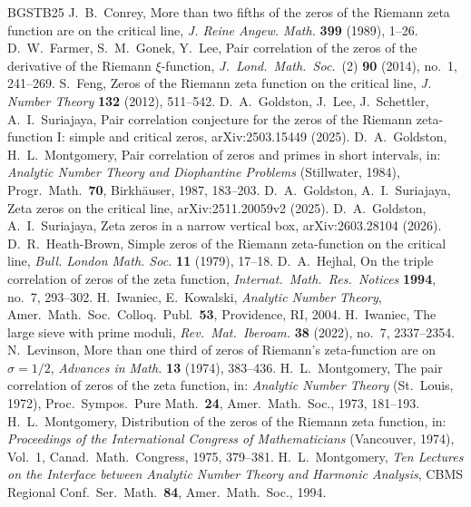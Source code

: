 \documentclass[11pt]{amsart}
\theoremstyle{definition}
\theoremstyle{remark}
\numberwithin{equation}{section}
\begin{document}
\begin{thebibliography}{BGSTB25}
 J.~B.~Conrey, More than two fifths of the zeros of the Riemann zeta function are on the critical line, \emph{J. Reine Angew. Math.} \textbf{399} (1989), 1--26.
 D.~W.~Farmer, S.~M.~Gonek, Y.~Lee, Pair correlation of the zeros of the derivative of the Riemann $\xi$-function, \emph{J.\ Lond.\ Math.\ Soc.}\ (2) \textbf{90} (2014), no.~1, 241--269.
 S.~Feng, Zeros of the Riemann zeta function on the critical line, \emph{J. Number Theory} \textbf{132} (2012), 511--542.
 D.~A.~Goldston, J.~Lee, J.~Schettler, A.~I.~Suriajaya, Pair correlation conjecture for the zeros of the Riemann zeta-function I: simple and critical zeros, arXiv:2503.15449 (2025).
 D.~A.~Goldston, H.~L.~Montgomery, Pair correlation of zeros and primes in short intervals, in: \emph{Analytic Number Theory and Diophantine Problems} (Stillwater, 1984), Progr.\ Math.\ \textbf{70}, Birkh\"auser, 1987, 183--203.
 D.~A.~Goldston, A.~I.~Suriajaya, Zeta zeros on the critical line, arXiv:2511.20059v2 (2025).
 D.~A.~Goldston, A.~I.~Suriajaya, Zeta zeros in a narrow vertical box, arXiv:2603.28104 (2026).
 D.~R.~Heath-Brown, Simple zeros of the Riemann zeta-function on the critical line, \emph{Bull. London Math. Soc.} \textbf{11} (1979), 17--18.
 D.~A.~Hejhal, On the triple correlation of zeros of the zeta function, \emph{Internat.\ Math.\ Res.\ Notices} \textbf{1994}, no.~7, 293--302.
 H.~Iwaniec, E.~Kowalski, \emph{Analytic Number Theory}, Amer.\ Math.\ Soc.\ Colloq.\ Publ.\ \textbf{53}, Providence, RI, 2004.
 H.~Iwaniec, The large sieve with prime moduli, \emph{Rev.\ Mat.\ Iberoam.} \textbf{38} (2022), no.~7, 2337--2354.
 N.~Levinson, More than one third of zeros of Riemann's zeta-function are on $\sigma=1/2$, \emph{Advances in Math.} \textbf{13} (1974), 383--436.
 H.~L.~Montgomery, The pair correlation of zeros of the zeta function, in: \emph{Analytic Number Theory} (St.\ Louis, 1972), Proc.\ Sympos.\ Pure Math.\ \textbf{24}, Amer.\ Math.\ Soc., 1973, 181--193.
 H.~L.~Montgomery, Distribution of the zeros of the Riemann zeta function, in: \emph{Proceedings of the International Congress of Mathematicians} (Vancouver, 1974), Vol.~1, Canad.\ Math.\ Congress, 1975, 379--381.
 H.~L.~Montgomery, \emph{Ten Lectures on the Interface between Analytic Number Theory and Harmonic Analysis}, CBMS Regional Conf.\ Ser.\ Math.\ \textbf{84}, Amer.\ Math.\ Soc., 1994.

\end{thebibliography}
\end{document}
